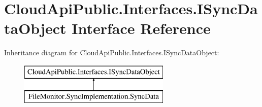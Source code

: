 \hypertarget{interface_cloud_api_public_1_1_interfaces_1_1_i_sync_data_object}{\section{Cloud\-Api\-Public.\-Interfaces.\-I\-Sync\-Data\-Object Interface Reference}
\label{interface_cloud_api_public_1_1_interfaces_1_1_i_sync_data_object}
}
Inheritance diagram for Cloud\-Api\-Public.\-Interfaces.\-I\-Sync\-Data\-Object\-:\begin{figure}[H]
\begin{center}
\leavevmode
\includegraphics[height=2.000000cm]{interface_cloud_api_public_1_1_interfaces_1_1_i_sync_data_object}
\end{center}
\end{figure}
